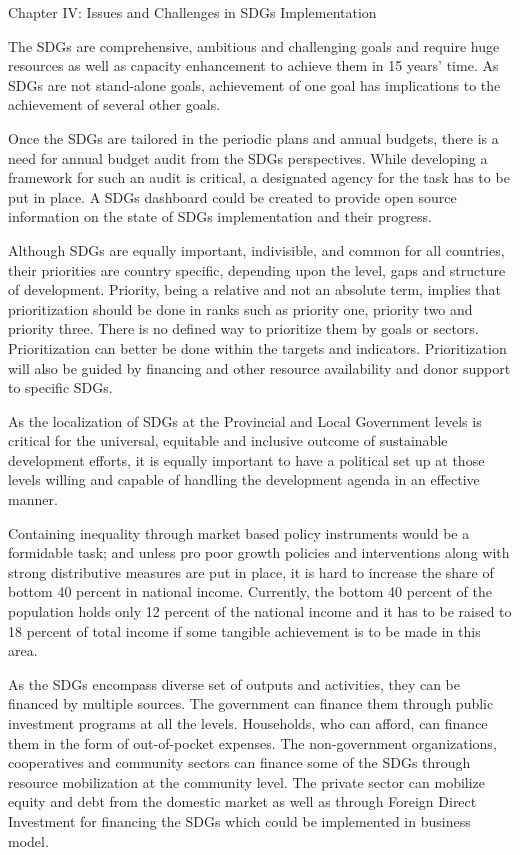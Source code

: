 \documentclass[
  openany]{book}
\begin{document}
Chapter IV: Issues and Challenges in SDGs Implementation

The SDGs are comprehensive, ambitious and challenging goals and require huge resources as well as capacity enhancement to achieve them in 15 years' time. As SDGs are not stand-alone goals, achievement of one goal has implications to the achievement of several other goals.

Once the SDGs are tailored in the periodic plans and annual budgets, there is a need for annual budget audit from the SDGs perspectives. While developing a framework for such an audit is critical, a designated agency for the task has to be put in place. A SDGs dashboard could be created to provide open source information on the state of SDGs implementation and their progress.

Although SDGs are equally important, indivisible, and common for all countries, their priorities are country specific, depending upon the level, gaps and structure of development. Priority, being a relative and not an absolute term, implies that prioritization should be done in ranks such as priority one, priority two and priority three. There is no defined way to prioritize them by goals or sectors. Prioritization can better be done within the targets and indicators. Prioritization will also be guided by financing and other resource availability and donor support to specific SDGs.

As the localization of SDGs at the Provincial and Local Government levels is critical for the universal, equitable and inclusive outcome of sustainable development efforts, it is equally important to have a political set up at those levels willing and capable of handling the development agenda in an effective manner.

Containing inequality through market based policy instruments would be a formidable task; and unless pro poor growth policies and interventions along with strong distributive measures are put in place, it is hard to increase the share of bottom 40 percent in national income. Currently, the bottom 40 percent of the population holds only 12 percent of the national income and it has to be raised to 18 percent of total income if some tangible achievement is to be made in this area.

As the SDGs encompass diverse set of outputs and activities, they can be financed by multiple sources. The government can finance them through public investment programs at all the levels. Households, who can afford, can finance them in the form of out-of-pocket expenses. The non-government organizations, cooperatives and community sectors can finance some of the SDGs through resource mobilization at the community level. The private sector can mobilize equity and debt from the domestic market as well as through Foreign Direct Investment for financing the SDGs which could be implemented in business model.
\end{document}

